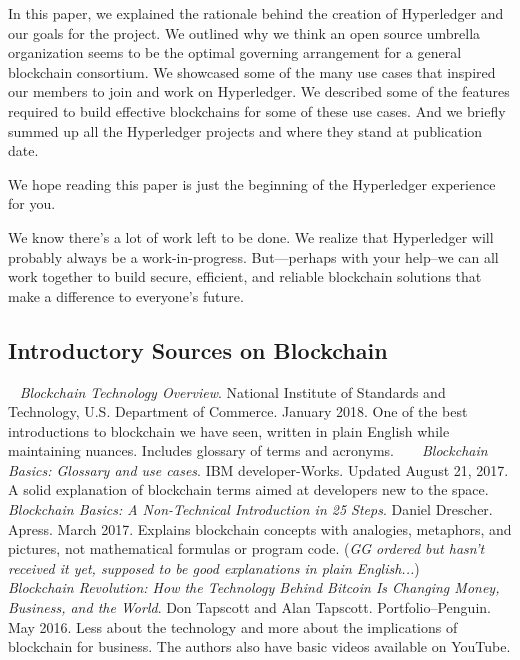 In this paper, we explained the rationale behind the creation of Hyperledger and our goals for the project. 
We outlined why we think an open source umbrella organization seems to be the optimal governing arrangement for a general blockchain consortium.
We showcased some of the many use cases that inspired our members to join and work on Hyperledger.
We described some of the features required to build effective blockchains for some of these use cases. 
And we briefly summed up all the Hyperledger projects and where they stand at publication date. 

We hope reading this paper is just the beginning of the Hyperledger experience for you. 

We know there's a lot of work left to be done.
We realize that Hyperledger will probably always be a work-in-progress. 
But---perhaps with your help--we can all work together to build secure, efficient, and reliable blockchain solutions that make a difference to everyone's future.

\subsection{Introductory Sources on Blockchain}
~\newline
\emph{Blockchain Technology Overview}. National Institute of Standards and Technology, U.S. Department of Commerce. January 2018. One of the best introductions to blockchain we have seen, written in plain English while maintaining nuances. Includes glossary of terms and acronyms. 
~\newline
~\newline
\emph{Blockchain Basics: Glossary and use cases}. IBM developer-Works. Updated August 21, 2017. A solid explanation of blockchain terms aimed at developers new to the space. 
~\newline
~\newline
\emph{Blockchain Basics: A Non-Technical Introduction in 25 Steps}. Daniel Drescher. Apress. March 2017. Explains blockchain concepts with analogies, metaphors, and pictures, not mathematical formulas or program code. (\emph{GG ordered but hasn't received it yet, supposed to be good explanations in plain English...})
~\newline
~\newline
\emph{Blockchain Revolution: How the Technology Behind Bitcoin Is Changing Money, Business, and the World}. Don Tapscott and Alan Tapscott. Portfolio--Penguin. May 2016. Less about the technology and more about the implications of blockchain for business. The authors also have basic videos available on YouTube. 

